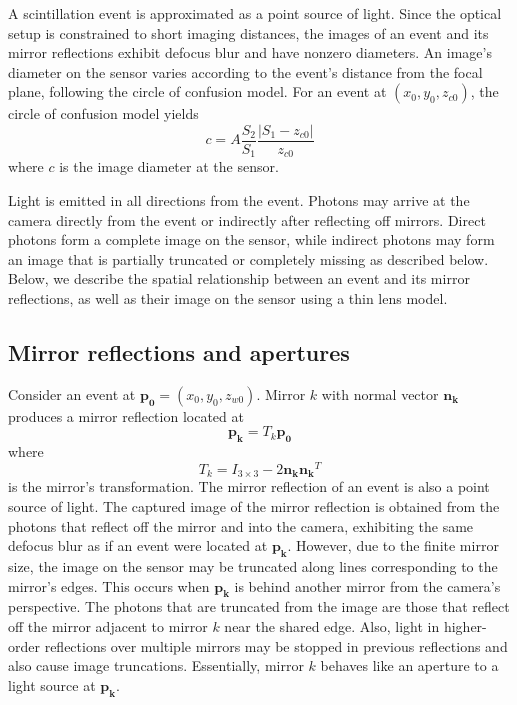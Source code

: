 A scintillation event is approximated as a point source of light.
Since the optical setup is constrained to short imaging distances, 
the images of an event and its mirror reflections exhibit defocus blur and 
have nonzero diameters.
An image's diameter on the sensor varies according to the event's distance from 
the focal plane, following the circle of confusion model.
For an event at $(x_0,y_0,z_{c0})$, 
the circle of confusion model yields
\begin{equation} \label{eqn:circ_of_conf}
c=A\frac{S_2}{S_1}\frac{|S_1-z_{c0}|}{z_{c0}}
\end{equation}
where $c$ is the image diameter at the sensor.

Light is emitted in all directions from the event.
Photons may arrive at the camera directly from the event or indirectly after 
reflecting off mirrors.
Direct photons form a complete image on the sensor, while indirect photons may 
form an image that is partially truncated or completely missing as described below.
Below, we describe the spatial relationship between an event and its mirror 
reflections, as well as their image on the sensor using a thin lens model.

\subsection{Mirror reflections and apertures}

Consider an event at $\bm{p_0}=(x_0,y_0,z_{w0})$.
Mirror $k$ with normal vector $\bm{n_k}$ produces a mirror reflection located at 
\begin{equation}
\bm{p_k}=T_k\bm{p_0}
\end{equation}
where
\begin{equation} \label{eqn:ref_trans}
T_k=I_{3\times3} - 2\bm{n_k}\bm{n_k}^T
\end{equation}
is the mirror's transformation.
The mirror reflection of an event is also a point source of light.
The captured image of the mirror reflection is obtained from the photons that 
reflect off the mirror and into the camera, exhibiting the same defocus blur as if 
an event were located at $\bm{p_k}$.
However, due to the finite mirror size, the image on the sensor may be truncated 
along lines corresponding to the mirror's edges.
This occurs when $\bm{p_k}$ is behind another mirror from the camera's perspective.
The photons that are truncated from the image are those that reflect off the 
mirror adjacent to mirror $k$ near the shared edge.
Also, light in higher-order reflections over multiple mirrors may be stopped 
in previous reflections and also cause image truncations.
Essentially, mirror $k$ behaves like an aperture to a light source at $\bm{p_k}$. 

